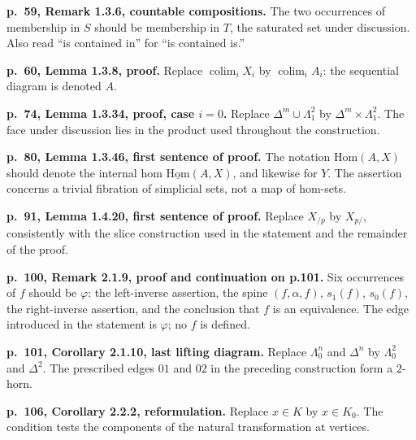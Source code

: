 \par{}
\noindent\textbf{p.~59, Remark 1.3.6, countable compositions.}\enspace
The two occurrences of membership in $S$ should be membership in $T$, the saturated set under discussion. Also read ``is contained in'' for ``is contained is.''

\par{}
\noindent\textbf{p.~60, Lemma 1.3.8, proof.}\enspace
Replace $\operatorname{colim}_i X_i$ by $\operatorname{colim}_i A_i$: the sequential diagram is denoted $A$.

\par{}
\noindent\textbf{p.~74, Lemma 1.3.34, proof, case $i=0$.}\enspace
Replace $\Delta^m\cup\Lambda^2_1$ by $\Delta^m\times\Lambda^2_1$. The face under discussion lies in the product used throughout the construction.

\par{}
\noindent\textbf{p.~80, Lemma 1.3.46, first sentence of proof.}\enspace
The notation $\mathrm{Hom}(A,X)$ should denote the internal hom $\underline{\mathrm{Hom}}(A,X)$, and likewise for $Y$. The assertion concerns a trivial fibration of simplicial sets, not a map of hom-sets.

\par{}
\noindent\textbf{p.~91, Lemma 1.4.20, first sentence of proof.}\enspace
Replace $X_{/p}$ by $X_{p/}$, consistently with the slice construction used in the statement and the remainder of the proof.

\par{}
\noindent\textbf{p.~100, Remark 2.1.9, proof and continuation on p.101.}\enspace
Six occurrences of $f$ should be $\varphi$: the left-inverse assertion, the spine $(f,\alpha,f)$, $s_1(f)$, $s_0(f)$, the right-inverse assertion, and the conclusion that $f$ is an equivalence. The edge introduced in the statement is $\varphi$; no $f$ is defined.

\par{}
\noindent\textbf{p.~101, Corollary 2.1.10, last lifting diagram.}\enspace
Replace $\Lambda^n_0$ and $\Delta^n$ by $\Lambda^2_0$ and $\Delta^2$. The prescribed edges $01$ and $02$ in the preceding construction form a $2$-horn.

\par{}
\noindent\textbf{p.~106, Corollary 2.2.2, reformulation.}\enspace
Replace $x\in K$ by $x\in K_0$. The condition tests the components of the natural transformation at vertices.


